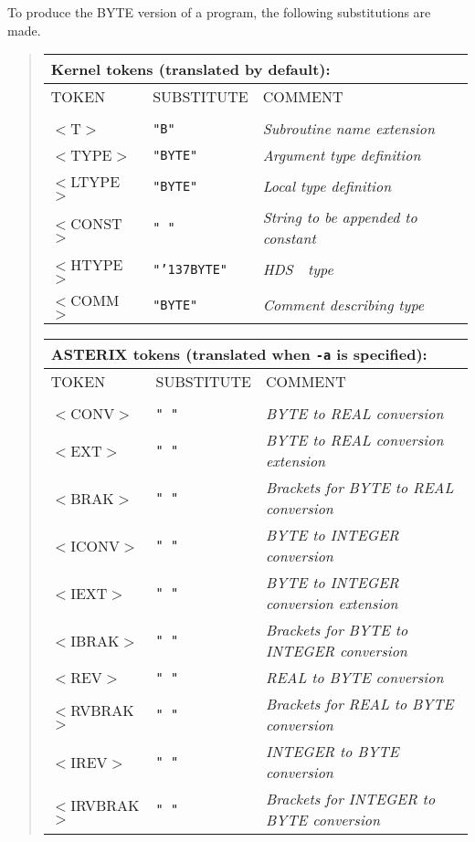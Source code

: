 \documentclass[twoside,11pt]{article}
\renewcommand{\_}{{\tt\char'137}}     %
\newcommand{\xref}[3]{#1}
\newcommand{\HDS}{{\footnotesize HDS}\normalsize}
\newcommand{\HDSref}{\xref{\HDS}{sun92}{}~}
\begin{document}
To produce the BYTE version of a program, the following substitutions
are made.
\begin{quote}
\begin{tabular}{lll}
\multicolumn{3}{l}{\bf{Kernel} tokens (translated by default):} \\
\hline
TOKEN  & SUBSTITUTE  & COMMENT \\
\\
$<$T$>$       & {\tt "B"}       &{\em Subroutine name extension} \\
$<$TYPE$>$    & {\tt "BYTE"}    &{\em Argument type definition} \\
$<$LTYPE$>$   & {\tt "BYTE"}    &{\em Local type definition} \\
$<$CONST$>$   & {\tt " "}       &{\em String to be appended to constant} \\
$<$HTYPE$>$   & {\tt "\_BYTE"}  &{\em \HDSref\ type} \\
$<$COMM$>$    & {\tt "BYTE"}    &{\em Comment describing type} \\
\end{tabular}

\begin{tabular}{lll}
\multicolumn{3}{l}{\bf{ASTERIX} tokens (translated when {\tt -a} is specified):} \\
\hline
TOKEN  &SUBSTITUTE  & COMMENT \\
\\
$<$CONV$>$    & {\tt " "} &{\em BYTE to REAL conversion} \\
$<$EXT$>$     & {\tt " "} &{\em BYTE to REAL conversion extension} \\
$<$BRAK$>$    & {\tt " "} &{\em Brackets for BYTE to REAL conversion} \\
$<$ICONV$>$   & {\tt " "} &{\em BYTE to INTEGER conversion} \\
$<$IEXT$>$    & {\tt " "} &{\em BYTE to INTEGER conversion extension} \\
$<$IBRAK$>$   & {\tt " "} &{\em Brackets for BYTE to INTEGER conversion} \\
$<$REV$>$     & {\tt " "} &{\em REAL to BYTE conversion} \\
$<$RVBRAK$>$  & {\tt " "} &{\em Brackets for REAL to BYTE conversion} \\
$<$IREV$>$    & {\tt " "} &{\em INTEGER to BYTE conversion} \\
$<$IRVBRAK$>$ & {\tt " "} &{\em Brackets for INTEGER to BYTE conversion} \\
\end{tabular}
\end{quote}
\end{document}
